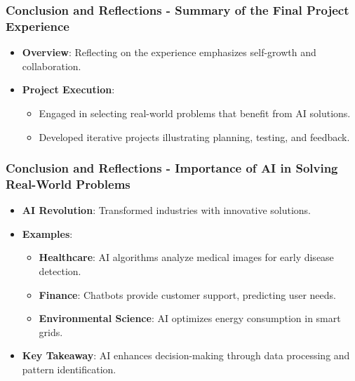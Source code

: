 \documentclass{beamer}
\begin{document}
\begin{frame}[fragile]
    \frametitle{Conclusion and Reflections - Summary of the Final Project Experience}
    
    \begin{itemize}
        \item \textbf{Overview}: Reflecting on the experience emphasizes self-growth and collaboration.
        \item \textbf{Project Execution}:
        \begin{itemize}
            \item Engaged in selecting real-world problems that benefit from AI solutions.
            \item Developed iterative projects illustrating planning, testing, and feedback.
        \end{itemize}
    \end{itemize}
\end{frame}

\begin{frame}[fragile]
    \frametitle{Conclusion and Reflections - Importance of AI in Solving Real-World Problems}
    
    \begin{itemize}
        \item \textbf{AI Revolution}: Transformed industries with innovative solutions.
        
        \item \textbf{Examples}:
        \begin{itemize}
            \item \textbf{Healthcare}: AI algorithms analyze medical images for early disease detection.
            \item \textbf{Finance}: Chatbots provide customer support, predicting user needs.
            \item \textbf{Environmental Science}: AI optimizes energy consumption in smart grids.
        \end{itemize}
        
        \item \textbf{Key Takeaway}: AI enhances decision-making through data processing and pattern identification.
    \end{itemize}
\end{frame}
\end{document}
